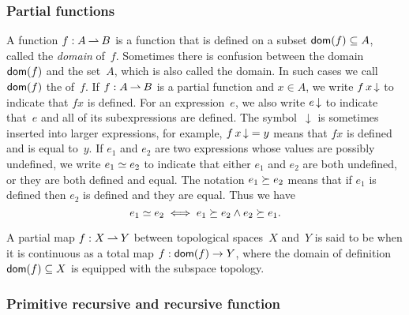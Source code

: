 \subsubsection*{Partial functions}

A  function $f: A \mathbin{\rightharpoonup} B$ is a function that is defined on a subset
$\mathsf{dom}(f) \subseteq A$, called the \emph{domain} of~$f$. Sometimes
there is confusion between the domain~$\mathsf{dom}(f)$ and the set~$A$, which
is also called the domain. In such cases we call $\mathsf{dom}(f)$ the
 of~$f$. If $f: A \mathbin{\rightharpoonup} B$ is a partial function and $x
\in A$, we write $f\, x\,{\downarrow}$ to indicate that $f x$ is defined.
For an expression~$e$, we also write $e\,{\downarrow}$ to indicate
that~$e$ and all of its subexpressions are defined. The
symbol~$\downarrow$ is sometimes inserted into larger expressions, for
example, $f\, x\,{\downarrow} = y$ means that $f x$ is defined and is
equal to~$y$. If $e_1$ and $e_2$ are two expressions whose values are
possibly undefined, we write $e_1 \simeq e_2$ to indicate that either
$e_1$ and $e_2$ are both undefined, or they are both defined and
equal. The notation $e_1 \succeq e_2$ means that if $e_1$ is defined
then $e_2$ is defined and they are equal. Thus we have
%
\begin{equation*}
  e_1 \simeq e_2 \iff e_1 \succeq e_2 \land e_2 \succeq e_1.
\end{equation*}

A partial map $f: X \mathbin{\rightharpoonup} Y$ between topological spaces~$X$ and~$Y$
is said to be  when it is continuous as a total map
$f: \mathsf{dom}(f) \to Y$, where the domain of definition $\mathsf{dom}(f) \subseteq
X$ is equipped with the subspace topology.



\subsubsection*{Primitive recursive and recursive function}

